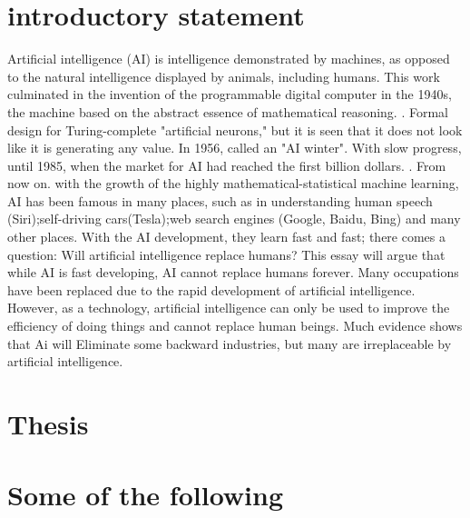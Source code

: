 \documentclass{thuemp}
\begin{document}
\maketitle

\wuhao 
\section*{introductory statement}

Artificial intelligence (AI) is intelligence demonstrated by
machines, as opposed to the natural intelligence displayed by
animals, including humans.\cite{enwiki:1084791620}
This work culminated in the invention of the programmable digital computer in the 1940s, 
the machine based on the abstract essence of mathematical reasoning. \cite{AI:found}. 
Formal design for Turing-complete "artificial neurons," but it is seen that it does not look like it is generating any value. 
In 1956, called an "AI winter"\cite{AI:winter}.
With slow progress, until 1985, when the market for AI had reached the first billion dollars. \cite{AI:spring}.
From now on. with the growth of the highly mathematical-statistical machine learning,
 AI has been famous in many places, such as in understanding human speech
 (Siri);self-driving cars(Tesla);web search engines
 (Google, Baidu, Bing) and many other places.
 With the AI development,
they learn fast and fast; there comes a question: Will artificial intelligence replace humans?
This essay will argue that while AI is fast developing, AI cannot replace humans forever. 
Many occupations have been replaced due to the rapid development of artificial intelligence. 
However, as a technology, artificial intelligence can only be used to improve the efficiency of doing things and cannot replace human beings.
Much evidence shows that Ai will Eliminate some backward industries, but many are irreplaceable by artificial intelligence.

\section*{Thesis}

\section*{Some of the following}
\end{document}
